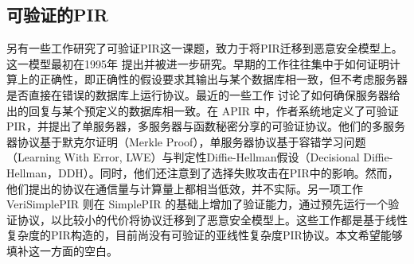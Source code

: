 \subsection{可验证的PIR}
另有一些工作研究了可验证PIR这一课题，致力于将PIR迁移到恶意安全模型上。这一模型最初在1995年 \cite{FOCS:CGKS95} 提出并被进一步研究\cite{SCN:BeiSta02, USENIX:DevGolHen12,SVPIR18, MerkleTree}。早期的工作往往集中于如何证明计算上的正确性，即正确性的假设要求其输出与某个数据库相一致，但不考虑服务器是否直接在错误的数据库上运行协议。最近的一些工作 \cite{VeriSimplePIR, APIR}讨论了如何确保服务器给出的回复与某个预定义的数据库相一致。在 APIR\cite{APIR} 中，作者系统地定义了可验证PIR，并提出了单服务器，多服务器与函数秘密分享的可验证协议。他们的多服务器协议基于默克尔证明（Merkle Proof），单服务器协议基于容错学习问题（Learning With Error, LWE）与判定性Diffie-Hellman假设（Decisional Diffie-Hellman，DDH）。同时，他们还注意到了选择失败攻击在PIR中的影响。然而，他们提出的协议在通信量与计算量上都相当低效，并不实际。另一项工作 VeriSimplePIR \cite{VeriSimplePIR} 则在 SimplePIR 的基础上增加了验证能力，通过预先运行一个验证协议，以比较小的代价将协议迁移到了恶意安全模型上。这些工作都是基于线性复杂度的PIR构造的，目前尚没有可验证的亚线性复杂度PIR协议。本文希望能够填补这一方面的空白。


